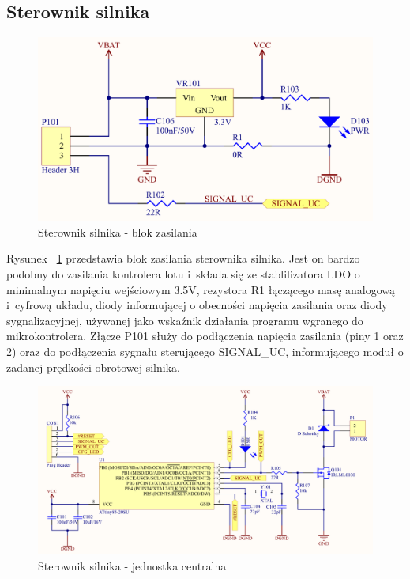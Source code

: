 \documentclass[11pt, twoside]{Thesis} %
\begin{document}
\subsection{Sterownik silnika}

\begin{figure}[H]
	\centering
	\includegraphics[scale=0.45]{Pictures/MotorController_PWR_C.png}
		\caption[Sterownik silnika - blok zasilania]{Sterownik silnika - blok zasilania}
	\label{fig:MotorDriver_PWR}
\end{figure}

Rysunek ~\ref{fig:MotorDriver_PWR} przedstawia blok zasilania sterownika silnika. Jest on bardzo podobny do zasilania kontrolera lotu i~składa się ze stablilizatora LDO o minimalnym napięciu wejściowym 3.5V, rezystora R1 łączącego masę analogową i~cyfrową układu, diody informującej o obecności napięcia zasilania oraz diody sygnalizacyjnej, używanej jako wskaźnik działania programu wgranego do mikrokontrolera. Złącze P101 służy do podłączenia napięcia zasilania (piny 1 oraz 2) oraz do podłączenia sygnału sterującego SIGNAL\_UC, informującego moduł o zadanej prędkości obrotowej silnika.

\begin{figure}[H]
	\centering
	\includegraphics[scale=0.30, angle=90]{Pictures/MotorController_Main_C.png}
		\caption[Sterownik silnika - jednostka centralna]{Sterownik silnika - jednostka centralna}
	\label{fig:MotorDriver_MAIN}
\end{figure}
\end{document}
